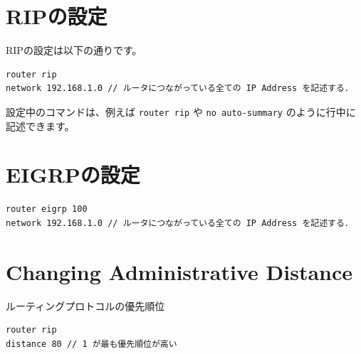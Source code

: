 \documentclass[uplatex,dvipdfmx]{bxjsarticle}
\begin{document}
\section{RIPの設定}

RIPの設定は以下の通りです。

\begin{lstlisting}[caption=RIP Settings]
router rip
network 192.168.1.0 // ルータにつながっている全ての IP Address を記述する．
\end{lstlisting}

設定中のコマンドは、例えば \texttt{router rip} や \texttt{no auto-summary} のように行中に記述できます。

\section{EIGRPの設定}

\begin{lstlisting}[caption=EIGRP Settings]
router eigrp 100
network 192.168.1.0 // ルータにつながっている全ての IP Address を記述する．
\end{lstlisting}

\section{Changing Administrative Distance}

ルーティングプロトコルの優先順位

\begin{lstlisting}[caption=Changing Administrative Distance]
router rip
distance 80 // 1 が最も優先順位が高い
\end{lstlisting}
\end{document}
